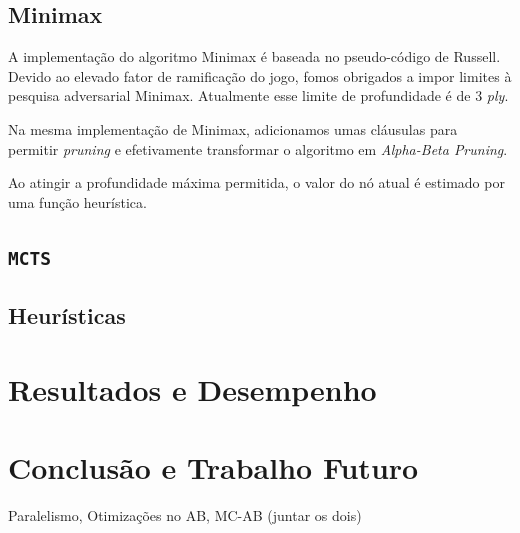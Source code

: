\documentclass[12pt,a4paper,oneside]{article}
\begin{document}
\lipsum[1]

\subsection{Minimax}

A implementação do algoritmo Minimax é baseada no pseudo-código de Russell\cite{Russell:AI:2003}. Devido ao elevado fator de ramificação do jogo, fomos obrigados a impor limites à pesquisa adversarial Minimax. Atualmente esse limite de profundidade é de 3 \emph{ply}.

Na mesma implementação de Minimax, adicionamos umas cláusulas para permitir \emph{pruning} e efetivamente transformar o algoritmo em \emph{Alpha-Beta Pruning}.

Ao atingir a profundidade máxima permitida, o valor do nó atual é estimado por uma função heurística.

\subsection{\texttt{MCTS}}

\lipsum[1]

\lipsum[2]

\lipsum[3]

\subsection{Heurísticas}

\lipsum[1]

\lipsum[2]

\lipsum[3]


\section{Resultados e Desempenho}
\label{sec:resdes}

\lipsum[1]

\lipsum[2]

\lipsum[3]


\section{Conclusão e Trabalho Futuro}
\label{sec:conc}

Paralelismo, Otimizações no AB, MC-AB (juntar os dois)\cite{Dutra:2015}

\lipsum[1]

\lipsum[2]



\end{document}
